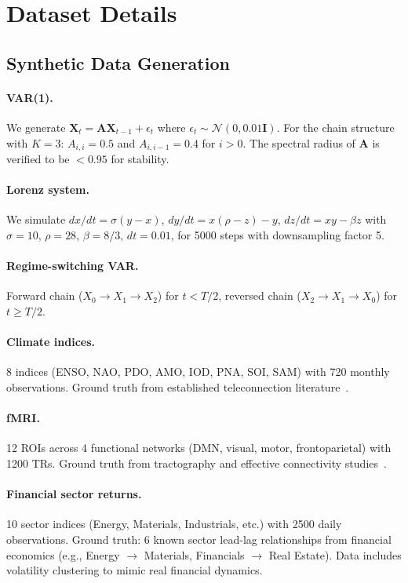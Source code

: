 \documentclass{article}
\newcommand{\bA}{\mathbf{A}}
\newcommand{\bX}{\mathbf{X}}
\begin{document}
\section{Dataset Details}
\label{app:datasets}

\subsection{Synthetic Data Generation}

\paragraph{VAR(1).} We generate $\bX_t = \bA \bX_{t-1} + \epsilon_t$ where
$\epsilon_t \sim \mathcal{N}(0, 0.01 \mathbf{I})$. For the chain structure
with $K=3$: $A_{i,i} = 0.5$ and $A_{i,i-1} = 0.4$ for $i > 0$. The spectral
radius of $\bA$ is verified to be $< 0.95$ for stability.

\paragraph{Lorenz system.} We simulate $dx/dt = \sigma(y-x)$, $dy/dt =
x(\rho-z) - y$, $dz/dt = xy - \beta z$ with $\sigma=10$, $\rho=28$,
$\beta=8/3$, $dt=0.01$, for 5000 steps with downsampling factor 5.

\paragraph{Regime-switching VAR.} Forward chain ($X_0 \to X_1 \to X_2$) for
$t < T/2$, reversed chain ($X_2 \to X_1 \to X_0$) for $t \geq T/2$.

\paragraph{Climate indices.} 8 indices (ENSO, NAO, PDO, AMO, IOD, PNA, SOI,
SAM) with 720 monthly observations. Ground truth from established
teleconnection literature~\citep{runge2019pcmci}.

\paragraph{fMRI.} 12 ROIs across 4 functional networks (DMN, visual, motor,
frontoparietal) with 1200 TRs. Ground truth from tractography and effective
connectivity studies~\citep{seth2015granger}.

\paragraph{Financial sector returns.} 10 sector indices (Energy, Materials,
Industrials, etc.) with 2500 daily observations. Ground truth: 6 known
sector lead-lag relationships from financial economics (e.g., Energy $\to$
Materials, Financials $\to$ Real Estate). Data includes volatility
clustering to mimic real financial dynamics.
\end{document}
